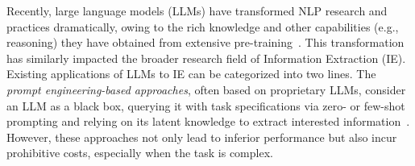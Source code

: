 Recently, large language models (LLMs) have transformed NLP research and practices dramatically, owing to the rich knowledge and other capabilities (e.g., reasoning) they have obtained from extensive pre-training~\cite{wei2022chain, chen2023program, shi2023dont}. This transformation has similarly impacted the broader research field of Information Extraction (IE). Existing applications of LLMs to IE can be categorized into two lines. The \emph{prompt engineering-based approaches}, often based on proprietary LLMs, consider an LLM as a black box, querying it with task specifications via zero- or few-shot prompting and relying on its latent knowledge to extract interested information~\cite{gao2023exploringfeasibilitychatgptevent, wang2023code4struct, li2023evaluating, srivastava-etal-2023-mailex}. However, these approaches not only lead to inferior performance but also incur prohibitive costs, especially when the task is complex.

